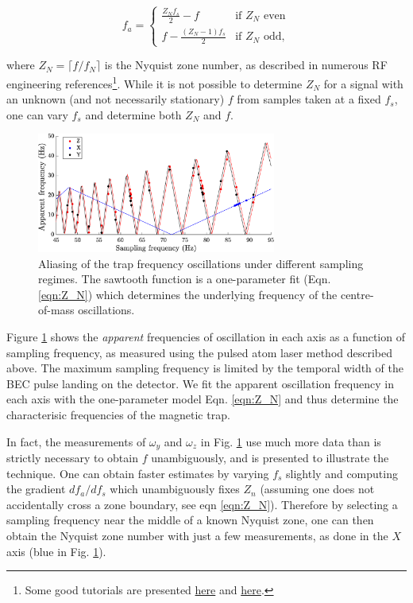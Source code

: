 	\begin{equation}
	 f_a =
	  \begin{cases}
	   \frac{Z_N f_s}{2} - f & \text{if } Z_N \text{ even} \\
	   f - \frac{(Z_N-1)f_s}{2}       & \text{if } Z_N \text{ odd},
	  \end{cases}
	  \label{eqn:Z_N}
	\end{equation}
	
	where $Z_N = \lceil{f/f_N}\rceil$ is the Nyquist zone number, as described in numerous RF engineering references\footnote{Some good tutorials are presented \href{https://www.analog.com/media/en/training-seminars/tutorials/MT-002.pdf}{here} and \href{https://www.taborelec.com/Multi-Nyquist-Zones-Operation-Solution-Note}{here}.}. While it is not possible to determine $Z_N$ for a signal with an unknown (and not necessarily stationary) $f$ from samples taken at a fixed $f_s$, one can vary $f_s$ and determine both $Z_N$ and $f$.
	
	\begin{figure}
	\centering
		\includegraphics[width=0.7\textwidth]{fig/QD/sawtooth}
			\caption{Aliasing of the trap frequency oscillations under different sampling regimes. The sawtooth function is a one-parameter fit (Eqn. \ref{eqn:Z_N}) which determines the underlying frequency of the centre-of-mass oscillations.}
			\label{fig:sawtooth_plot}
	\end{figure}	

	Figure \ref{fig:sawtooth_plot} shows the \emph{apparent} frequencies of oscillation in each axis as a function of sampling frequency, as measured using the pulsed atom laser method described above.
	The maximum sampling frequency is limited by the temporal width of the BEC pulse landing on the detector. 
	We fit the apparent oscillation frequency in each axis with the one-parameter model Eqn. \ref{eqn:Z_N} and thus determine the characterisic frequencies of the magnetic trap.

	In fact, the measurements of $\omega_y$ and $\omega_z$ in Fig. \ref{fig:sawtooth_plot} use much more data than is strictly necessary to obtain $f$ unambiguously, and is presented to illustrate the technique. 
	One can obtain faster estimates by varying $f_s$ slightly and computing the gradient $df_a/df_s$ which unambiguously fixes $Z_n$ (assuming one does not accidentally cross a zone boundary, see eqn \ref{eqn:Z_N}).
	Therefore by selecting a sampling frequency near the middle of a known Nyquist zone, one can then obtain the Nyquist zone number with just a few measurements, as done in the $X$ axis (blue in Fig. \ref{fig:sawtooth_plot}). 
	
